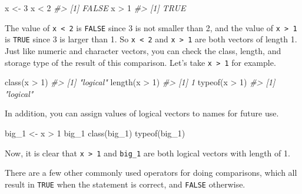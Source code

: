 \documentclass[
]{book}
\newenvironment{Shaded}{\begin{snugshade}}{\end{snugshade}}
\newcommand{\CommentTok}[1]{\textcolor[rgb]{0.56,0.35,0.01}{\textit{#1}}}
\newcommand{\DecValTok}[1]{\textcolor[rgb]{0.00,0.00,0.81}{#1}}
\newcommand{\FunctionTok}[1]{\textcolor[rgb]{0.00,0.00,0.00}{#1}}
\newcommand{\NormalTok}[1]{#1}
\newcommand{\OtherTok}[1]{\textcolor[rgb]{0.56,0.35,0.01}{#1}}
\newcommand{\SpecialCharTok}[1]{\textcolor[rgb]{0.00,0.00,0.00}{#1}}
\begin{document}
\begin{Shaded}
\begin{Highlighting}[]
\NormalTok{x }\OtherTok{\textless{}{-}} \DecValTok{3}
\NormalTok{x }\SpecialCharTok{\textless{}} \DecValTok{2}
\CommentTok{\#\textgreater{} [1] FALSE}
\NormalTok{x }\SpecialCharTok{\textgreater{}} \DecValTok{1}
\CommentTok{\#\textgreater{} [1] TRUE}
\end{Highlighting}
\end{Shaded}

The value of \texttt{x\ \textless{}\ 2} is \texttt{FALSE} since 3 is not smaller than 2, and the value of \texttt{x\ \textgreater{}\ 1} is \texttt{TRUE} since 3 is larger than 1. So \texttt{x\ \textless{}\ 2} and \texttt{x\ \textgreater{}\ 1} are both vectors of length 1. Just like numeric and character vectors, you can check the class, length, and storage type of the result of this comparison. Let's take \texttt{x\ \textgreater{}\ 1} for example.

\begin{Shaded}
\begin{Highlighting}[]
\FunctionTok{class}\NormalTok{(x }\SpecialCharTok{\textgreater{}} \DecValTok{1}\NormalTok{)}
\CommentTok{\#\textgreater{} [1] "logical"}
\FunctionTok{length}\NormalTok{(x }\SpecialCharTok{\textgreater{}} \DecValTok{1}\NormalTok{)}
\CommentTok{\#\textgreater{} [1] 1}
\FunctionTok{typeof}\NormalTok{(x }\SpecialCharTok{\textgreater{}} \DecValTok{1}\NormalTok{)}
\CommentTok{\#\textgreater{} [1] "logical"}
\end{Highlighting}
\end{Shaded}

In addition, you can assign values of logical vectors to names for future use.

\begin{Shaded}
\begin{Highlighting}[]
\NormalTok{big\_1 }\OtherTok{\textless{}{-}}\NormalTok{ x }\SpecialCharTok{\textgreater{}} \DecValTok{1}
\NormalTok{big\_1}
\FunctionTok{class}\NormalTok{(big\_1)}
\FunctionTok{typeof}\NormalTok{(big\_1)}
\end{Highlighting}
\end{Shaded}

Now, it is clear that \texttt{x\ \textgreater{}\ 1} and \texttt{big\_1} are both logical vectors with length of 1.

There are a few other commonly used operators for doing comparisons, which all result in \texttt{TRUE} when the statement is correct, and \texttt{FALSE} otherwise.
\end{document}
